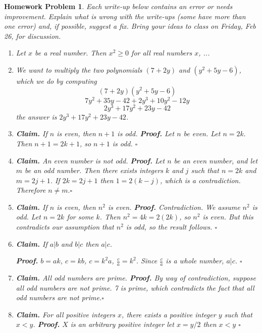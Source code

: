 \documentclass{article}
\newtheorem{hw}{Homework Problem}
\begin{document}
	\begin{hw}
		Each write-up below contains an error or needs improvement. Explain what is wrong with the write-ups (some have more than one error) and, if possible, suggest a fix. Bring your ideas to class on Friday, Feb 26, for discussion.
		\begin{enumerate}
			\item Let $x$ be a real number. Then $x^2\geq 0$ for all real numbers $x$, ...
			\vspace{0.5in}
			\item We want to multiply the two polynomials  $(7+2y)$ and $(y^2+5y-6)$, which we do by computing
			$$(7+2y)(y^2+5y-6)$$
			$$7y^2+35y-42+2y^3+10y^2-12y$$
			$$2y^3+17y^2+23y-42$$
			the answer is $2y^3+17y^2+23y-42$.
			\vspace{0.5in}
			\item {\bf Claim.} If $n$ is even, then $n+1$ is odd.
				{\bf Proof.} Let $n$ be even. Let $n=2k.$   Then $n+1=2k+1$, so $n+1$ is odd. \hfill  $\square$
			\vspace{0.5in}
			\item {\bf Claim.}  An even number is not odd.
				{\bf Proof.} Let $n$ be an even number, and let $m$ be an odd number. Then there exists integers $k$ and $j$ such that $n=2k$ and $m=2j+1$. If $2k=2j+1$ then $1=2(k-j)$, which is a contradiction. Therefore $n \neq m.$\hfill  $\square$
			\vspace{0.5in}
			\item {\bf Claim.}  If $n$ is even, then $n^2$ is even.
				{\bf Proof.}  Contradiction. We assume $n^2$ is odd. Let $n=2k$ for some $k$. Then $n^2=4k=2(2k)$, so $n^2$ is even. But this contradicts our assumption that $n^2$ is odd, so the result follows. \hfill  $\square$
			\vspace{0.5in}
			\item {\bf Claim.}  If $a|b$ and $b|c$ then $a|c$.

				{\bf Proof.}  $b=ak$, $c=kb$, $c=k^2a$, $\frac{c}{a}=k^2$.
			Since $\frac{c}{a}$ is a whole number, $a|c$. \hfill  $\square$
			\vspace{0.5in}
			\item {\bf Claim.}   All odd numbers are prime.
				{\bf Proof.}
			By way of contradiction, suppose all odd numbers are not prime.
			7 is prime, which contradicts the fact that all odd numbers are
			not prime.\hfill  $\square$
			\vspace{0.5in}
			\item {\bf Claim.}  For all positive integers $x$, there exists a positive integer $y$ such that $x<y$.
				{\bf Proof.}  $X$ is an arbitrary positive integer let $x =y/2$ then $x<y$  \hfill  $\square$
		\end{enumerate}
		\vfill
	\end{hw}
\end{document}
